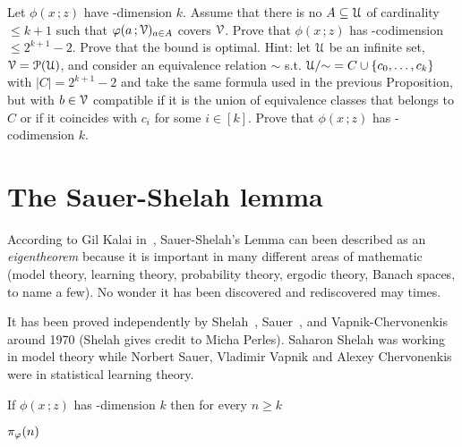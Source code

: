 \documentclass[scombinatorics.tex]{subfiles}
\begin{document}
\begin{exercise}
  Let $\phi(x\,;z)$ have \vc-dimension $k$.
  Assume that there is no $A\subseteq\EuScript U$ of cardinality $\le k+1$ such that $\varphi(a\,;\EuScript V)_{a\in A}$ covers $\EuScript V$.
  Prove that $\phi(x\,;z)$ has \vc-codimension $\le2^{k+1}-2$.
  Prove that the bound is optimal.
  Hint: let $\EuScript U$ be an infinite set, $\EuScript V = \EuScript P(\EuScript U)$, and consider an equivalence relation $\sim$ s.t. $\EuScript U / {\sim} = C \cup \{c_0, \dots, c_k\}$ with $|C| = 2^{k+1}-2$ and take the same formula used in the previous Proposition, but with $b \in \EuScript V$ compatible if it is the union of equivalence classes that belongs to $C$ or if it coincides with $c_i$ for some $i \in [k]$.
  Prove that $\phi(x\,;z)$ has \vc-codimension $k$.\QED
\end{exercise}


  


\section{The Sauer-Shelah lemma}\label{sauer}

\def\ceq#1#2#3{\parbox[t]{15ex}{$\displaystyle #1$}\medrel{#2}{$\displaystyle #3$}}

According to Gil Kalai in~\cite{kalai}, Sauer-Shelah's Lemma can been described as an \textit{eigentheorem\/} because it is important in many different areas of mathematic (model theory, learning theory, probability theory, ergodic theory, Banach spaces, to name a few).
No wonder it has been discovered and rediscovered may times.

It has been proved independently by Shelah~\cite{shelah72}, Sauer~\cite{sauer}, and Vapnik-Cher\-vo\-nen\-kis~\cite{VC} around 1970 (Shelah gives credit to Micha Perles).
Saharon Shelah was working in model theory while Norbert Sauer, Vladimir Vapnik and Alexey Chervonenkis were in statistical learning theory.

\begin{void_thm}\label{lem_sauer}
If $\phi(x\,;z)$ has \vc-dimension $k$ then for every $n\ge k$

\ceq{\hfill\pi_\phi(n)}{\le}{\bigsum^{k}_{i=0} \binom{n}{i}.}
\end{void_thm}
\end{document}
